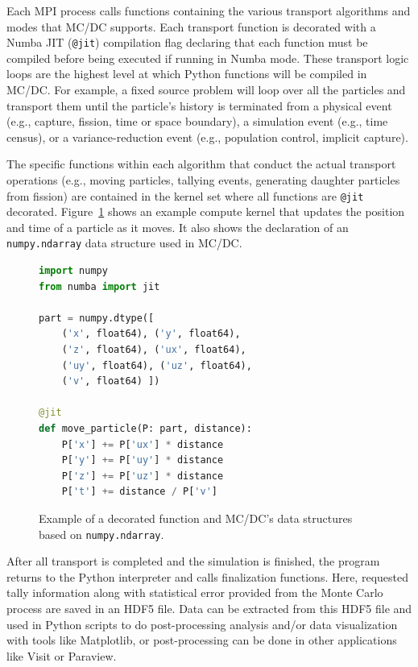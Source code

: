 Each MPI process calls functions containing the various transport algorithms and modes that MC/DC supports.
Each transport function is decorated with a Numba JIT (\texttt{@jit}) compilation flag declaring that each function must be compiled before being executed if running in Numba mode.
These transport logic loops are the highest level at which Python functions will be compiled in MC/DC.
For example, a fixed source problem will loop over all the particles and transport them until the particle's history is terminated from a physical event (e.g., capture, fission, time or space boundary), a simulation event (e.g., time census), or a variance-reduction event (e.g., population control, implicit capture).

The specific functions within each algorithm that conduct the actual transport operations (e.g., moving particles, tallying events, generating daughter particles from fission) are contained in the kernel set where all functions are \texttt{@jit} decorated.
Figure~\ref{fig:jitfunctions} shows an example compute kernel that updates the position and time of a particle as it moves.
It also shows the declaration of an \texttt{numpy.ndarray} data structure used in MC/DC.

\begin{figure}
\begin{lstlisting}[language=Python]
import numpy
from numba import jit

part = numpy.dtype([
    ('x', float64), ('y', float64),
    ('z', float64), ('ux', float64),
    ('uy', float64), ('uz', float64),
    ('v', float64) ])

@jit
def move_particle(P: part, distance):
    P['x'] += P['ux'] * distance
    P['y'] += P['uy'] * distance
    P['z'] += P['uz'] * distance
    P['t'] += distance / P['v']
\end{lstlisting}
\caption{Example of a decorated function and MC/DC's data structures based on \texttt{numpy.ndarray}.}
\label{fig:jitfunctions}
\end{figure}

After all transport is completed and the simulation is finished, the program returns to the Python interpreter and calls finalization functions.
Here, requested tally information along with statistical error provided from the Monte Carlo process are saved in an HDF5 file.
Data can be extracted from this HDF5 file and used in Python scripts to do post-processing analysis and/or data visualization with tools like Matplotlib, or post-processing can be done in other applications like Visit or Paraview.

